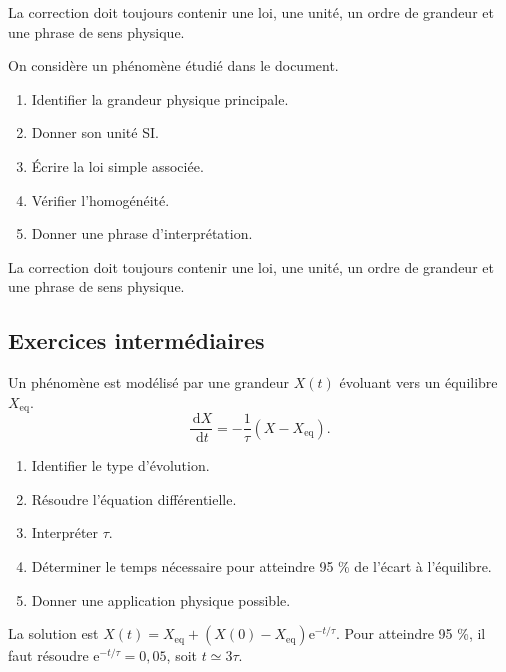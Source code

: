 \documentclass[11pt,a4paper]{article}
\newcommand{\dd}{\,\mathrm d}
\newcommand{\e}{\mathrm e}
\begin{document}
\begin{corrigebox}[Indication 29]
La correction doit toujours contenir une loi, une unité, un ordre de grandeur et une phrase de sens physique.
\end{corrigebox}

\begin{exercicebox}
On considère un phénomène étudié dans le document. 
\begin{enumerate}
  \item Identifier la grandeur physique principale.
  \item Donner son unité SI.
  \item Écrire la loi simple associée.
  \item Vérifier l'homogénéité.
  \item Donner une phrase d'interprétation.
\end{enumerate}
\end{exercicebox}

\begin{corrigebox}[Indication 30]
La correction doit toujours contenir une loi, une unité, un ordre de grandeur et une phrase de sens physique.
\end{corrigebox}

\subsection{Exercices intermédiaires}

\begin{exercicebox}
Un phénomène est modélisé par une grandeur $X(t)$ évoluant vers un équilibre $X_{\mathrm{eq}}$.
\[
\frac{\dd X}{\dd t}=-\frac1\tau(X-X_{\mathrm{eq}}).
\]
\begin{enumerate}
  \item Identifier le type d'évolution.
  \item Résoudre l'équation différentielle.
  \item Interpréter $\tau$.
  \item Déterminer le temps nécessaire pour atteindre 95 \% de l'écart à l'équilibre.
  \item Donner une application physique possible.
\end{enumerate}
\end{exercicebox}

\begin{corrigebox}[Correction 1]
La solution est $X(t)=X_{\mathrm{eq}}+(X(0)-X_{\mathrm{eq}})\e^{-t/\tau}$. Pour atteindre 95 \%, il faut résoudre $\e^{-t/\tau}=0{,}05$, soit $t\simeq3\tau$.
\end{corrigebox}
\end{document}
